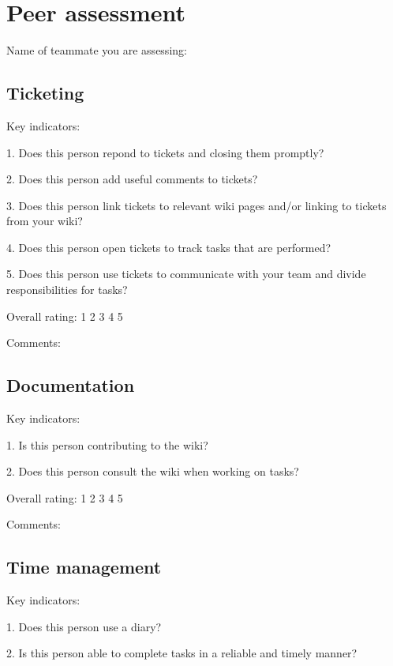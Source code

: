 \documentclass{article}   	%
\begin{document}
\newpage

\section*{Peer assessment}

Name of teammate you are assessing: 
\vskip 1cm

\subsection*{Ticketing}

Key indicators: 

1.  Does this person repond to tickets and closing them promptly?

2.  Does this person add useful comments to tickets?

3.  Does this person link tickets to relevant wiki pages and/or linking to tickets from your wiki?

4.  Does this person open tickets to track tasks that are performed?

5.  Does this person use tickets to communicate with your team and divide responsibilities for tasks?

Overall rating: \hskip 1cm 1 \hskip 1cm 2 \hskip 1cm 3 \hskip 1cm 4 \hskip 1cm 5 

Comments:

\vskip 5cm



\subsection*{Documentation}

Key indicators: 

1.  Is this person contributing to the wiki?

2.  Does this person consult the wiki when working on tasks?

Overall rating: \hskip 1cm 1 \hskip 1cm 2 \hskip 1cm 3 \hskip 1cm 4 \hskip 1cm 5 

Comments:

\newpage

\subsection*{Time management}

Key indicators: 

1.  Does this person use a diary?

2.  Is this person able to complete tasks in a reliable and timely manner?
\end{document}
